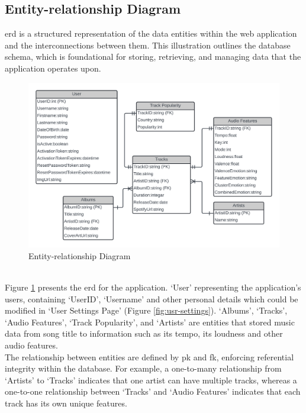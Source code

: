 \subsection{Entity-relationship Diagram}
\gls{erd} is a structured representation of the data entities within the web application and the interconnections between them. 
This illustration outlines the database schema, which is foundational for storing, retrieving, and managing data that the application operates upon.
\begin{figure}[!ht]
    \centering
    \includegraphics[width=14cm]{Images/erd.png}
    \caption{Entity-relationship Diagram}
    \label{fig:erd}
\end{figure}
\\
\indent Figure \ref{fig:erd} presents the \gls{erd} for the application.
`User' representing the application's users, containing `UserID', `Username' and other personal details which could be modified in `User Settings Page' (Figure \ref{fig:usr-settings}).
`Albums', `Tracks', `Audio Features', `Track Popularity', and `Artists' are entities that stored music data from song title to information such as its tempo, its loudness and other audio features.
\\
\indent The relationship between entities are defined by \gls{pk} and \gls{fk}, enforcing referential integrity within the database.
For example, a one-to-many relationship from `Artists' to `Tracks' indicates that one artist can have multiple tracks, whereas a one-to-one relationship between `Tracks' and `Audio Features' indicates that each track has its own unique features.
\\
